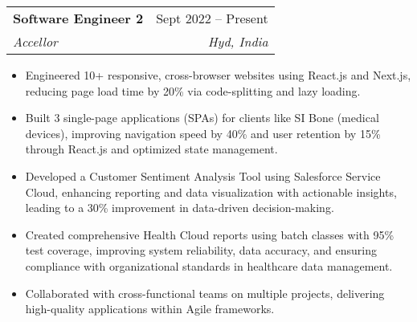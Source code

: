 \documentclass[letterpaper,11pt]{article}
\makeatletter
\newcommand{\resumeItem}[1]{
  \item\small{
    {#1 \vspace{-2pt}}
  }
}
\newcommand{\resumeSubheading}[4]{
  \vspace{-2pt}\item
    \begin{tabular*}{0.97\textwidth}[t]{l@{\extracolsep{\fill}}r}
      \textbf{#1} & #2 \\
      \textit{\small#3} & \textit{\small #4} \\
    \end{tabular*}\vspace{-7pt}
}
\newcommand{\resumeSubSubheading}[2]{
    \item
    \begin{tabular*}{0.97\textwidth}{l@{\extracolsep{\fill}}r}
      \textit{\small#1} & \textit{\small #2} \\
    \end{tabular*}\vspace{-7pt}
}
\newcommand{\resumeSubHeadingListEnd}{\end{itemize}}
\newcommand{\resumeItemListStart}{\begin{itemize}}
\newcommand{\resumeItemListEnd}{\end{itemize}\vspace{-5pt}}
\makeatother
\begin{document}
    \resumeSubheading
      {Software Engineer 2}{Sept 2022 -- Present}
      {Accellor}{Hyd, India}
      \resumeItemListStart
        \resumeItem{Engineered 10+ responsive, cross-browser websites using React.js and Next.js, reducing page load time by 20\% via code-splitting and lazy loading.}
        \resumeItem{Built 3 single-page applications (SPAs) for clients like SI Bone (medical devices), improving navigation speed by 40\% and user retention by 15\% through React.js and optimized state management.}
        \resumeItem{Developed a Customer Sentiment Analysis Tool using Salesforce Service Cloud, enhancing reporting and data
visualization with actionable insights, leading to a 30\% improvement in data-driven
decision-making.}
        \resumeItem{Created comprehensive Health Cloud reports using batch classes with 95\% test coverage, improving system reliability, data accuracy, and ensuring compliance with organizational standards in healthcare data management.}
        \resumeItem{Collaborated with cross-functional teams on multiple projects, delivering high-quality applications within Agile frameworks.}
      \resumeItemListEnd


\end{document}
